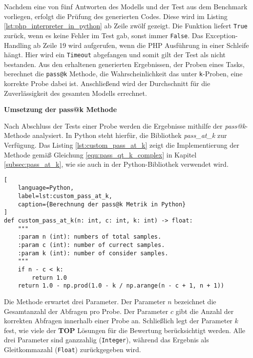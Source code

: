 Nachdem eine von fünf Antworten des Modells und der Test aus dem Benchmark vorliegen, erfolgt die Prüfung des generierten Codes. Diese wird im Listing \ref{lst:php_interpreter_in_python} ab Zeile zwölf gezeigt. Die Funktion liefert \texttt{True} zurück, wenn es keine Fehler im Test gab, sonst immer \texttt{False}. Das Exception-Handling ab Zeile 19 wird aufgerufen, wenn die PHP Ausführung in einer Schleife hängt. Hier wird ein \texttt{Timeout} abgefangen und somit gilt der Test als nicht bestanden. Aus den erhaltenen generierten Ergebnissen, der Proben eines Tasks, berechnet die \texttt{pass@k} Methode, \glqq die Wahrscheinlichkeit das unter \texttt{k}-Proben, eine korrekte Probe dabei ist\grqq . Anschließend wird der Durchschnitt für die Zuverlässigkeit des gesamten Modells errechnet.\vspace{0.2cm}

\textbf{Umsetzung der pass@k Methode}\vspace{0.2cm}

Nach Abschluss der Tests einer Probe werden die Ergebnisse mithilfe der \textit{pass@k}-Methode analysiert. In Python steht hierfür, die Bibliothek \textit{pass\_at\_k} zur Verfügung. Das Listing \ref{lst:custom_pass_at_k} zeigt die Implementierung der Methode gemäß Gleichung \ref{equ:pass_qt_k_complex} in Kapitel \ref{subsec:pass_at_k}, wie sie auch in der Python-Bibliothek verwendet wird.  


\begin{lstlisting}[
	language=Python,
	label=lst:custom_pass_at_k,
	caption={Berechnung der pass@k Metrik in Python}
]
def custom_pass_at_k(n: int, c: int, k: int) -> float:
    """
    :param n (int): numbers of total samples.
    :param c (int): number of currect samples.
    :param k (int): number of consider samples.
    """
    if n - c < k:
        return 1.0
    return 1.0 - np.prod(1.0 - k / np.arange(n - c + 1, n + 1))
\end{lstlisting}

Die Methode erwartet drei Parameter. Der Parameter $n$ bezeichnet die Gesamtanzahl der Abfragen pro Probe. Der Parameter $c$ gibt die Anzahl der korrekten Abfragen innerhalb einer Probe an. Schließlich legt der Parameter $k$ fest, wie viele der \textbf{TOP} Lösungen für die Bewertung berücksichtigt werden. Alle drei Parameter sind ganzzahlig (\texttt{Integer}), während das Ergebnis als Gleitkommazahl (\texttt{Float}) zurückgegeben wird.  

